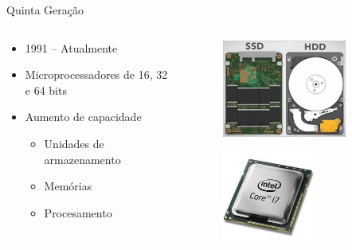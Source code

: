 \documentclass[aspectratio=169,
				xcolor=table]{beamer}
\begin{document}
	\begin{frame}[t]{Quinta Geração}
		\begin{columns}
			\begin{column}{0.65\textwidth}
				\begin{itemize}
					\item 1991 – Atualmente 
					\vspace{1em}
					\item Microprocessadores de 16, 32 e 64 bits
					\vspace{1em}
					\item Aumento de capacidade
					\begin{itemize}
						\item Unidades de armazenamento
						\item Memórias
						\item Procesamento
					\end{itemize}
				\end{itemize}
			\end{column}
			\begin{column}{0.35\textwidth}
				\vspace{-1em}
				\begin{figure}
					\includegraphics[width=0.8\textwidth, keepaspectratio]{../figs/cap03/geracao52} 			
				\end{figure}
				\vspace{-2em}
				\begin{figure}
					\includegraphics[width=0.6\textwidth, keepaspectratio]{../figs/cap03/geracao51} 			

\end{figure}
\end{column}
\end{columns}
\end{frame}
\end{document}
